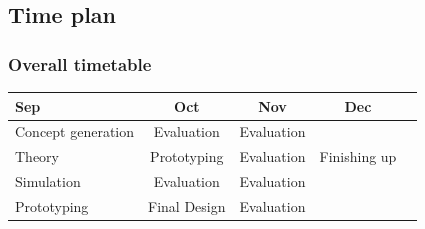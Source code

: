 \documentclass{beamer}
\begin{document}





























\begin{frame}
    \subsection{Time plan}
    \frametitle{Overall timetable}
    \begin{table}
        \begin{tabular}{| l | c | c | c | c }
            
            Sep & Oct & Nov & Dec \\
            \hline \hline
            Concept generation & Evaluation & Evaluation &  \\ 
            \hline
            Theory & Prototyping & Evaluation & Finishing up \\
            \hline
            Simulation & Evaluation & Evaluation & \\
            \hline
            Prototyping & Final Design & Evaluation &  \\
            \hline
 
        \end{tabular}
    \end{table}    
\end{frame}
\end{document}
